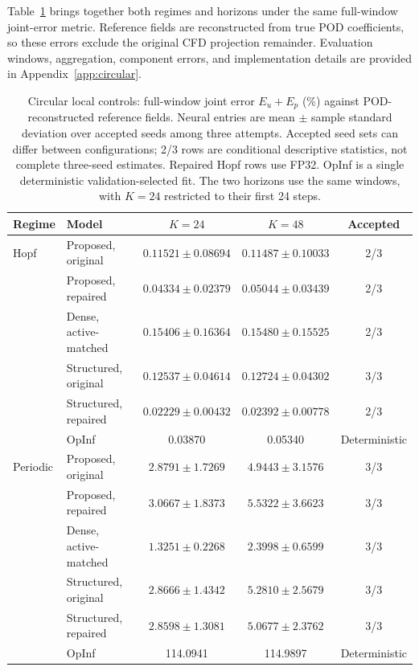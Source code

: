 Table~\ref{tab:circular_full_reorg} brings together both regimes and
horizons under the same full-window joint-error metric.
Reference fields are reconstructed from true POD coefficients, so
these errors exclude the original CFD projection remainder.
Evaluation windows, aggregation, component errors, and implementation
details are provided in Appendix~\ref{app:circular}.

\begin{table}[H]
\centering
\small
\setlength{\tabcolsep}{4pt}
\caption{Circular local controls: full-window joint error
$E_u+E_p$ (\%) against POD-reconstructed reference fields.
Neural entries are mean $\pm$ sample standard deviation over accepted
seeds among three attempts. Accepted seed sets can differ between
configurations; 2/3 rows are conditional descriptive statistics,
not complete three-seed estimates. Repaired Hopf rows use FP32.
OpInf is a single deterministic validation-selected fit.
The two horizons use the same windows, with $K=24$ restricted to
their first 24 steps.}
\label{tab:circular_full_reorg}
\begin{tabular}{@{}llccc@{}}
\toprule
Regime & Model & $K=24$ & $K=48$ & Accepted\\
\midrule
Hopf & Proposed, original
& $0.11521\pm0.08694$ & $0.11487\pm0.10033$ & 2/3\\
& Proposed, repaired
& $0.04334\pm0.02379$ & $0.05044\pm0.03439$ & 2/3\\
& Dense, active-matched
& $0.15406\pm0.16364$ & $0.15480\pm0.15525$ & 2/3\\
& Structured, original
& $0.12537\pm0.04614$ & $0.12724\pm0.04302$ & 3/3\\
& Structured, repaired
& $0.02229\pm0.00432$ & $0.02392\pm0.00778$ & 2/3\\
& OpInf & 0.03870 & 0.05340 & Deterministic\\
\midrule
Periodic & Proposed, original
& $2.8791\pm1.7269$ & $4.9443\pm3.1576$ & 3/3\\
& Proposed, repaired
& $3.0667\pm1.8373$ & $5.5322\pm3.6623$ & 3/3\\
& Dense, active-matched
& $\mathbf{1.3251\pm0.2268}$ & $\mathbf{2.3998\pm0.6599}$ & 3/3\\
& Structured, original
& $2.8666\pm1.4342$ & $5.2810\pm2.5679$ & 3/3\\
& Structured, repaired
& $2.8598\pm1.3081$ & $5.0677\pm2.3762$ & 3/3\\
& OpInf & 114.0941 & 114.9897 & Deterministic\\
\bottomrule
\end{tabular}
\end{table}

